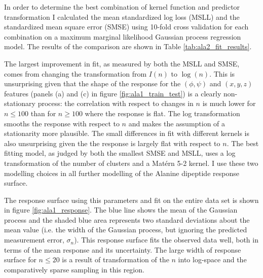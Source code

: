 In order to determine the best combination of kernel function and predictor transformation I calculated the mean standardized log loss (MSLL) and the standardized mean square error (SMSE) using 10-fold cross validation for each combination on a maximum marginal likelihood Gaussian process regression model.  The results of the comparison are shown in Table \ref{tab:ala2_fit_results}. 



The largest improvement in fit, as measured by both the MSLL and SMSE, comes from changing the transformation from $I(n)$ to $\log{(n)}$. This is unsurprising given that the shape of the response for the $(\phi, \psi)$ and $(x,y,z)$ features (panels (a) and (c) in figure \ref{fig:ala1_train_test}) is a clearly non-stationary process: the correlation with respect to changes in $n$ is much lower for $n\leq 100$ than for $n\geq 100$ where the response is flat. The log transformation smooths the response with respect to $n$ and makes the assumption of a stationarity more plausible. The small differences in fit with different kernels is also unsurprising given the the response is largely flat with respect to $n$. The best fitting model, as judged by both the smallest SMSE and MSLL, uses a log transformation of the number of clusters and a Mat{\'e}rn 5-2 kernel. I use these two modelling choices in all further modelling of the Alanine dipeptide response surface.  

The response surface using this parameters and fit on the entire data set is shown in figure \ref{fig:ala1_response}. The blue line shows the mean of the Gaussian process and the shaded blue area represents two standard deviations about the mean value (i.e. the width of the Gaussian process, but ignoring the predicted measurement error, $\sigma_n$). This response surface fits the observed data well, both in terms of the mean response and its uncertainty. The large width of response surface for $n \leq 20$ is a result of transformation of the $n$ into log-space and the comparatively sparse sampling in this region.






